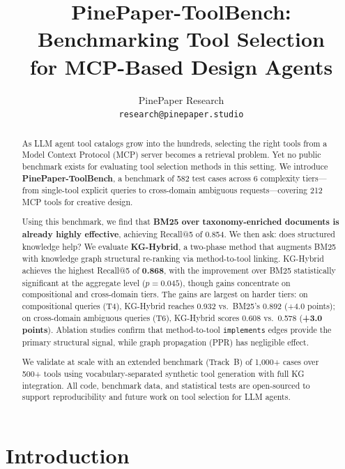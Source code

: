 \documentclass[11pt,a4paper]{article}
\title{PinePaper-ToolBench: Benchmarking Tool Selection\\for MCP-Based Design Agents}
\author{
  PinePaper Research\\
  \texttt{research@pinepaper.studio}
}
\date{}
\begin{document}
\maketitle

\begin{abstract}

As LLM agent tool catalogs grow into the hundreds, selecting the right tools from a Model Context Protocol (MCP) server becomes a retrieval problem. Yet no public benchmark exists for evaluating tool selection methods in this setting. We introduce \textbf{PinePaper-ToolBench}, a benchmark of 582 test cases across 6 complexity tiers---from single-tool explicit queries to cross-domain ambiguous requests---covering 212 MCP tools for creative design.

Using this benchmark, we find that \textbf{BM25 over taxonomy-enriched documents is already highly effective}, achieving Recall@5 of 0.854. We then ask: does structured knowledge help? We evaluate \textbf{KG-Hybrid}, a two-phase method that augments BM25 with knowledge graph structural re-ranking via method-to-tool linking. KG-Hybrid achieves the highest Recall@5 of \textbf{0.868}, with the improvement over BM25 statistically significant at the aggregate level ($p=0.045$), though gains concentrate on compositional and cross-domain tiers. The gains are largest on harder tiers: on compositional queries (T4), KG-Hybrid reaches 0.932 vs.\ BM25's 0.892 (+4.0 points); on cross-domain ambiguous queries (T6), KG-Hybrid scores 0.608 vs.\ 0.578 (\textbf{+3.0 points}). Ablation studies confirm that method-to-tool \texttt{implements} edges provide the primary structural signal, while graph propagation (PPR) has negligible effect.

We validate at scale with an extended benchmark (Track~B) of 1,000+ cases over 500+ tools using vocabulary-separated synthetic tool generation with full KG integration. All code, benchmark data, and statistical tests are open-sourced to support reproducibility and future work on tool selection for LLM agents.

\end{abstract}

\section{Introduction}
\label{sec:intro}
\end{document}
